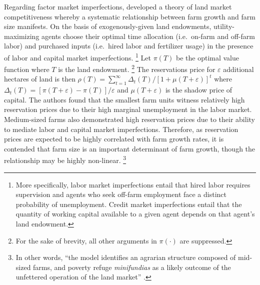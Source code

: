 \documentclass[english]{article}
\begin{document}
Regarding factor market imperfections, \citet{carter1993} developed a theory 
of land market competitiveness whereby a systematic relationship between 
farm growth and farm size manifests.
On the basis of exogenously-given land endowments, utility-maximizing 
agents choose their optimal time allocation 
(i.e.\ on-farm and off-farm labor) and purchased inputs 
(i.e.\ hired labor and fertilizer usage) in the presence of labor and 
capital market imperfections.%
\footnote{More specifically, labor market imperfections entail that hired 
labor requires supervision and agents who seek off-farm employment face a 
distinct probability of unemployment. 
Credit market imperfections entail that the quantity of working capital 
available to a given agent depends on that agent's land endowment.}
Let $\pi(T)$ be the optimal value function where $T$ is the land endowment.%
\footnote{For the sake of brevity, all other arguments in $\pi(\cdot)$ are 
suppressed.}
The reservations price for $\varepsilon$ additional hectares of land is then 
$\rho(T) = \sum_{t=1}^{\infty} \Delta_t(T)/[1 + \mu(T + \varepsilon)]^t$
where $\Delta_t(T) = [\pi(T + \varepsilon) - \pi(T)]/\varepsilon $ and 
$\mu(T + \varepsilon)$ is the shadow price of capital.
The authors found that the smallest farm units witness relatively high 
reservation prices due to their high marginal unemployment in the labor 
market. 
Medium-sized farms also demonstrated high reservation prices due to 
their ability to mediate labor and capital market imperfections.
Therefore, as reservation prices are expected to be highly correlated with farm 
growth rates, it is contended that farm size is an important determinant of 
farm growth, though the relationship may be highly non-linear.%
\footnote{In other words, ``the model identifies an agrarian structure 
composed of mid-sized farms, and poverty refuge \emph{minifundias} as a 
likely outcome of the unfettered operation of the land market'' 
\citep[pg.\ 1097]{carter1993}.}
\end{document}
